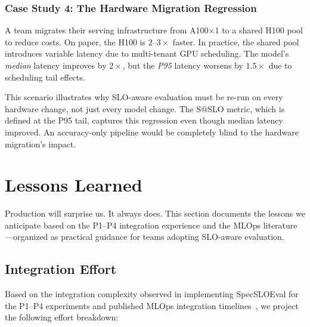\documentclass[11pt]{article}
\makeatletter
\newcommand{\sslo}{\ensuremath{\mathrm{S@SLO}}}
\makeatother
\begin{document}
\subsubsection{Case Study 4: The Hardware Migration Regression}

A team migrates their serving infrastructure from A100$\times$1 to a shared H100 pool to reduce costs. On paper, the H100 is $2$--$3\times$ faster. In practice, the shared pool introduces variable latency due to multi-tenant GPU scheduling. The model's \emph{median} latency improves by $2\times$, but the \emph{P95} latency worsens by $1.5\times$ due to scheduling tail effects.

This scenario illustrates why SLO-aware evaluation must be re-run on every hardware change, not just every model change. The $\sslo{}$ metric, which is defined at the P95 tail, captures this regression even though median latency improved. An accuracy-only pipeline would be completely blind to the hardware migration's impact.

\section{Lessons Learned}
\label{sec:lessons}

Production will surprise us. It always does. This section documents the lessons we anticipate based on the P1--P4 integration experience and the MLOps literature---organized as practical guidance for teams adopting SLO-aware evaluation.

\subsection{Integration Effort}

Based on the integration complexity observed in implementing SpecSLOEval for the P1--P4 experiments and published MLOps integration timelines~\cite{amershimultiversion2019,kreuzberger2023mlops}, we project the following effort breakdown:
\end{document}
